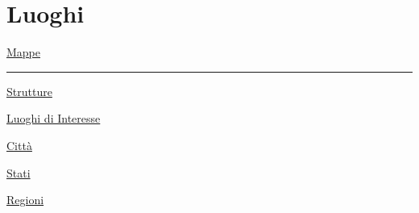 \section{Luoghi}\label{luoghi}

\href{Mappe\%2017f34984559b42f19491accd0de6374e.md}{Mappe}

\begin{center}\rule{0.5\linewidth}{0.5pt}\end{center}

\href{Strutture\%206c5da10b12964a6db18fbbf8f8fb4e70.md}{Strutture}

\href{Luoghi\%20di\%20Interesse\%206dad974b40da40d39baa6b6099fa25ab.md}{Luoghi
di Interesse}

\href{Citta\%CC\%80\%20c8d9c4f7919944319174e2e1d77731ed.md}{Città}

\href{Stati\%20c4b027d2ee8942f88feb7d6915ceea8d.md}{Stati}

\href{Regioni\%20f1176a3444b844519f0e4e0d01e21613.md}{Regioni}
